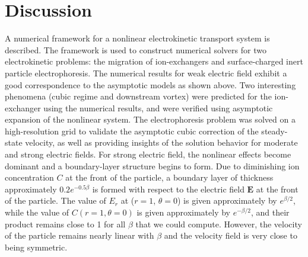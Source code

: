 \documentclass[MSc,beforeExam]{iitcsthesis}
\newcommand\bE{\boldsymbol{E}}
\begin{document}
\section{Discussion} \label{sec:discussion}
A numerical framework for a
nonlinear electrokinetic transport system is described.
The framework is used to construct numerical solvers 
for two electrokinetic problems: the migration of ion-exchangers
and surface-charged inert particle electrophoresis.
The numerical results for weak electric field 
exhibit a good correspondence to the asymptotic models as shown above.
Two interesting phenomena (cubic regime and downstream vortex) were predicted for the ion-exchanger
using the numerical results, and were verified using asymptotic expansion of the nonlinear system.
The electrophoresis problem was solved on a high-resolution grid to validate the asymptotic 
cubic correction of the steady-state velocity, as well as providing insights of the solution behavior 
for moderate and strong electric fields.
For strong electric field, the nonlinear effects become dominant and
a boundary-layer structure begins to form.
Due to diminishing ion concentration $C$ at the front of the particle,
a boundary layer of thickness approximately $0.2 e^{-0.5\beta}$ 
is formed with respect to the electric field $\bE$ at the front of the particle.
The value of $E_r$ at ($r = 1$, $\theta = 0$) is given approximately by 
$e^{\beta/2}$, while the value of $C(r = 1, \theta = 0)$ is given approximately 
by $e^{-\beta/2}$, and their product remains close to 1 for all $\beta$ that we could compute.
However, the velocity of the particle remains nearly linear with $\beta$
and the velocity field is very close to being symmetric.
\end{document}
